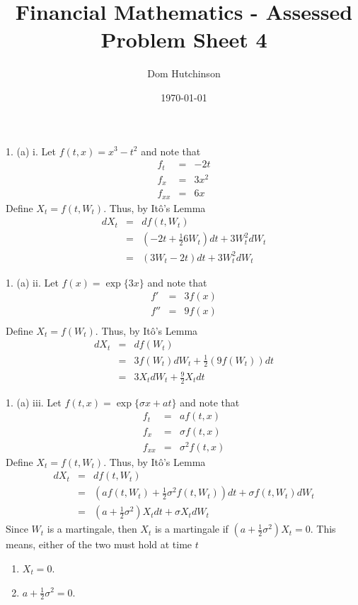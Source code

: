 \documentclass[11pt,a4paper]{article}
\begin{document}
\questionsfalse

\title{Financial Mathematics - Assessed Problem Sheet 4}
\author{Dom Hutchinson}
\date{\today}
\maketitle

\begin{answer}{1. (a) i.}
  Let $f(t,x)=x^3-t^2$ and note that
  \[\begin{array}{rcl}
    f_t&=&-2t\\
    f_x&=&3x^2\\
    f_{xx}&=&6x
  \end{array}\]
  Define $X_t=f(t,W_t)$. Thus, by It\^o's Lemma
  \[\begin{array}{rcl}
    dX_t&=&df(t,W_t)\\
    &=&\left(-2t+\frac126W_t\right)dt+3W_t^2dW_t\\
    &=&\left(3W_t-2t\right)dt+3W_t^2dW_t
  \end{array}\]
\end{answer}

\begin{answer}{1. (a) ii.}
  Let $f(x)=\exp\{3x\}$ and note that
  \[\begin{array}{rcl}
    f'&=&3f(x)\\
    f''&=&9f(x)\\
  \end{array}\]
  Define $X_t=f(W_t)$. Thus, by It\^o's Lemma
  \[\begin{array}{rcl}
    dX_t&=&df(W_t)\\
    &=&3f(W_t)dW_t+\frac12\left(9f(W_t)\right)dt\\
    &=&3X_tdW_t+\frac92X_tdt
  \end{array}\]
\end{answer}

\begin{answer}{1. (a) iii.}
  Let $f(t,x)=\exp\{\sigma x+a t\}$ and note that
  \[\begin{array}{rcl}
    f_t&=&af(t,x)\\
    f_x&=&\sigma f(t,x)\\
    f_{xx}&=&\sigma^2 f(t,x)
  \end{array}\]
  Define $X_t=f(t,W_t)$. Thus, by It\^o's Lemma
  \[\begin{array}{rcl}
    dX_t&=&df(t,W_t)\\
    &=&\left(af(t,W_t)+\frac12\sigma^2f(t,W_t)\right)dt+\sigma f(t,W_t)dW_t\\
    &=&\left(a+\frac12\sigma^2\right)X_tdt+\sigma X_tdW_t
  \end{array}\]
  Since $W_t$ is a martingale, then $X_t$ is a martingale if $\left(a+\frac12\sigma^2\right)X_t=0$. This means, either of the two must hold at time $t$
  \begin{enumerate}
    \item $X_t=0$.
    \item $a+\frac12\sigma^2=0$.
  \end{enumerate}
\end{answer}
\end{document}
